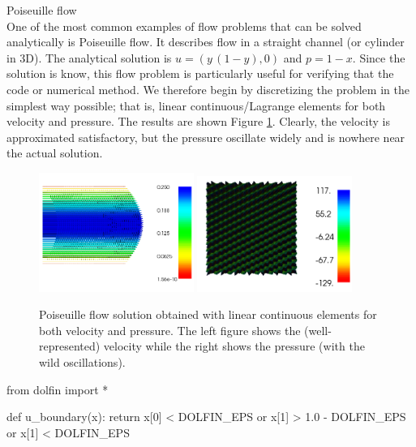 \begin{example}{Poiseuille flow} \\
One of the most common examples of flow problems that can be solved
analytically is Poiseuille flow. It describes flow in a straight
channel (or cylinder in 3D).  The analytical solution is $u=(y\,
(1-y), 0)$ and $p = 1-x$.  Since the solution is know, this flow
problem is particularly useful for verifying that the code or
numerical method. We therefore begin by discretizing the problem in
the simplest way possible; that is, linear continuous/Lagrange elements
for both velocity and pressure. The results are shown Figure
\ref{fig:stokes1}. Clearly, the velocity is approximated satisfactory,
but the pressure oscillate widely and is nowhere near the actual
solution.
\begin{figure}
\begin{center}
\includegraphics[width=0.45\textwidth]{chapters/Stokes_problem/plots/stokes_velocity.png}
\includegraphics[width=0.45\textwidth]{chapters/Stokes_problem/plots/stokes_pressure_instabilities.png}
\caption{Poiseuille flow solution obtained with linear continuous elements for
both velocity and pressure. The left figure shows the (well-represented) velocity while the right shows
the pressure (with the wild oscillations).}
\label{fig:stokes1}
\end{center}
\end{figure}

\begin{python}
from dolfin import *

def u_boundary(x):
  return x[0] < DOLFIN_EPS or x[1] > 1.0 - DOLFIN_EPS or x[1] < DOLFIN_EPS


\end{python}
\end{example}
